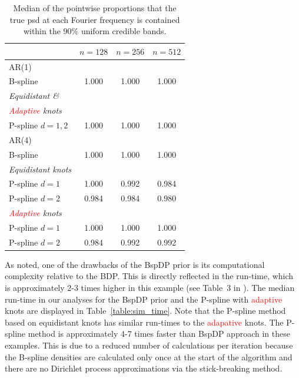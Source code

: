 \documentclass[twocolumn,final]{svjour3}
\newcommand{\pmr}{ \color{blue}}
\begin{document}
\begin{table}
	\centering
		\begin{tabular}{lccc}
			\toprule
			& $n=128$ & $n=256$ & $n=512$ \\ \hline
			AR(1)     &  &  &  \\ 
			B-spline &  1.000 & 1.000 & 1.000 \\
			\textit{Equidistant \&}& & &   \\
			\textit{\textcolor{red}{Adaptive} knots}& & &   \\
			\hspace{0.5em}P-spline $d=1,2$ & 1.000 & 1.000 & 1.000  \\ \hline	 		      
			AR(4)     &  &  &  \\ 
			B-spline &  1.000 & 1.000 & 1.000 \\
			\textit{Equidistant knots}& & &   \\
			\hspace{0.5em}P-spline $d=1$ &  1.000 & 0.992 & 0.984 \\
			\hspace{0.5em}P-spline $d=2$&  0.984 & 0.984 & 0.980 \\
			\textit{\textcolor{red}{Adaptive} knots}& & &   \\	
			\hspace{0.5em}P-spline $d=1$ & 1.000 & 1.000 & 1.000 \\
			\hspace{0.5em}P-spline $d=2$ & 0.984 & 0.992 & 0.992\\	
			\bottomrule
		\end{tabular}
	\caption{Median of the pointwise  proportions that the true psd at each Fourier frequency is contained within the $90\%$ uniform credible bands.}
	\label{table:sim_covPbb_median}
\end{table}



As \cite{Edwards2019} noted, one of the drawbacks of the BspDP prior  is its computational complexity relative to the BDP.  This is directly reflected in the run-time, which is approximately 2-3 times higher in this example (see Table~3 in \cite{Edwards2019}).  The median run-time in our analyses for the BspDP prior and the P-spline with \textcolor{red}{adaptive} knots are displayed in Table~\ref{table:sim_time}.  Note that the P-spline method based on equidistant knots has similar run-times to the \textcolor{red}{adapative} knots.  The P-spline method is approximately {\pmr 4-7} times faster than BspDP approach in these examples.  This is due to a reduced number of calculations  per iteration because the B-spline densities are calculated only  once at the start of the algorithm and there are no Dirichlet process approximations via the stick-breaking method.  
\end{document}
